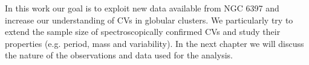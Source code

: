 In this work our goal is to exploit new data available from NGC 6397 and increase our understanding of CVs in globular clusters. We particularly try to extend the sample size of spectroscopically confirmed CVs and study their properties (e.g. period, mass and variability). In the next chapter we will discuss the nature of the observations and data used for the analysis.

